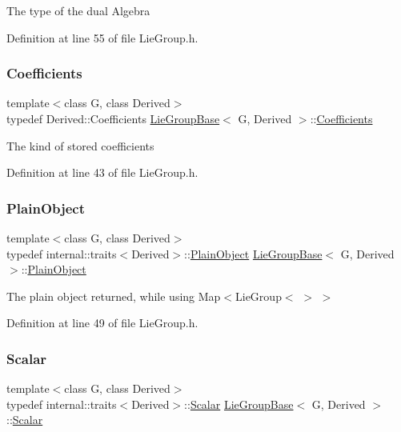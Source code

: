 The type of the dual Algebra 

Definition at line 55 of file Lie\+Group.\+h.

\hypertarget{class_lie_group_base_abb840873afd0a4f54f9ad4265e1d0095}{}\label{class_lie_group_base_abb840873afd0a4f54f9ad4265e1d0095} 
\subsubsection{\texorpdfstring{Coefficients}{Coefficients}}
{\footnotesize\ttfamily template$<$class G, class Derived$>$ \\
typedef Derived\+::\+Coefficients \hyperlink{class_lie_group_base}{Lie\+Group\+Base}$<$ G, Derived $>$\+::\hyperlink{class_lie_group_base_abb840873afd0a4f54f9ad4265e1d0095}{Coefficients}}

The kind of stored coefficients 

Definition at line 43 of file Lie\+Group.\+h.

\hypertarget{class_lie_group_base_a37b1d64048a2fa65b298801f6028c468}{}\label{class_lie_group_base_a37b1d64048a2fa65b298801f6028c468} 
\subsubsection{\texorpdfstring{Plain\+Object}{PlainObject}}
{\footnotesize\ttfamily template$<$class G, class Derived$>$ \\
typedef internal\+::traits$<$Derived$>$\+::\hyperlink{class_lie_group_base_a37b1d64048a2fa65b298801f6028c468}{Plain\+Object} \hyperlink{class_lie_group_base}{Lie\+Group\+Base}$<$ G, Derived $>$\+::\hyperlink{class_lie_group_base_a37b1d64048a2fa65b298801f6028c468}{Plain\+Object}}

The plain object returned, while using Map$<$Lie\+Group$<$ $>$ $>$ 

Definition at line 49 of file Lie\+Group.\+h.

\hypertarget{class_lie_group_base_aca48436862e5a14a15b91566440ef964}{}\label{class_lie_group_base_aca48436862e5a14a15b91566440ef964} 
\subsubsection{\texorpdfstring{Scalar}{Scalar}}
{\footnotesize\ttfamily template$<$class G, class Derived$>$ \\
typedef internal\+::traits$<$Derived$>$\+::\hyperlink{class_lie_group_base_aca48436862e5a14a15b91566440ef964}{Scalar} \hyperlink{class_lie_group_base}{Lie\+Group\+Base}$<$ G, Derived $>$\+::\hyperlink{class_lie_group_base_aca48436862e5a14a15b91566440ef964}{Scalar}}

